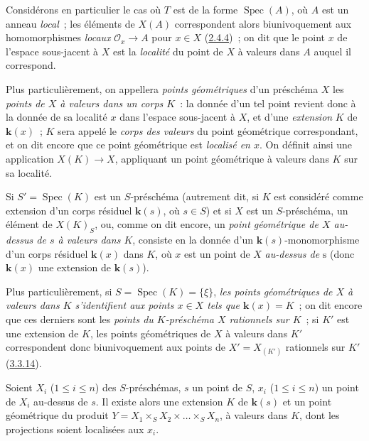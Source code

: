 \begin{env}[3.4.5]
\label{I.3.4.5-fr}
Considérons en particulier le cas où $T$ est de la forme $\operatorname{Spec}(A)$,
où $A$ est un anneau \emph{local}~; les éléments de $X(A)$ correspondent alors
biunivoquement aux homomorphismes \emph{locaux} $\mathcal{O}_x\to A$ pour
$x\in X$ (\hyperref[I.2.4.4-fr]{2.4.4})~; on dit que le point $x$ de l'espace
sous-jacent à $X$ est la \emph{localité} du point de $X$ à valeurs dans $A$
auquel il correspond.

Plus particulièrement, on appellera \emph{points géométriques} d'un préschéma
$X$ les \emph{points de $X$ à valeurs dans un corps $K$}~: la donnée d'un tel
point revient donc à la donnée de sa
localité $x$ dans l'espace sous-jacent à $X$, et d'une \emph{extension} $K$ de
$\boldsymbol{k}(x)$~; $K$ sera appelé le \emph{corps des valeurs} du point géométrique
correspondant, et on dit encore que ce point géométrique est \emph{localisé en
$x$}. On définit ainsi une application $X(K)\to X$, appliquant un point
géométrique à valeurs dans $K$ sur sa localité.

Si $S'=\operatorname{Spec}(K)$ est un $S$-préschéma (autrement dit, si $K$ est
considéré comme extension d'un corps résiduel $\boldsymbol{k}(s)$, où $s\in S$) et si $X$
est un $S$-préschéma, un élément de $X(K)_S$, ou, comme on dit encore, un
\emph{point géométrique de $X$ au-dessus de $s$ à valeurs dans $K$}, consiste
en la donnée d'un $\boldsymbol{k}(s)$-monomorphisme d'un corps résiduel $\boldsymbol{k}(x)$ dans $K$, où
$x$ est un point de $X$ \emph{au-dessus de} $\mathrm{s}$ (donc $\boldsymbol{k}(x)$ une extension de
$\boldsymbol{k}(s)$).

Plus particulièrement, si $S=\operatorname{Spec}(K)=\{\xi\}$, \emph{les points
géométriques de $X$ à valeurs dans $K$ s'identifient aux points $x\in X$ tels
que $\boldsymbol{k}(x)=K$}~; on dit encore que ces derniers sont les \emph{points du
$K$-préschéma $X$ rationnels sur $K$}~; si $K'$ est une extension de $K$, les
points géométriques de $X$ à valeurs dans $K'$ correspondent donc
biunivoquement aux points de $X'=X_{(K')}$ rationnels sur $K'$
(\hyperref[I.3.3.14-fr]{3.3.14}).
\end{env}

\begin{lemma}[3.4.6]
\label{I.3.4.6-fr}
Soient $X_i$ ($1\leq i\leq n$) des $S$-préschémas, $s$ un point de $S$, $x_i$
($1\leq i\leq n$) un point de $X_i$ au-dessus de $s$. Il existe alors une
extension $K$ de $\boldsymbol{k}(s)$ et un point géométrique du produit
$Y=X_1\times_S X_2\times\ldots\times_S X_n$, à valeurs dans $K$, dont les
projections soient localisées aux $x_i$.
\end{lemma}

